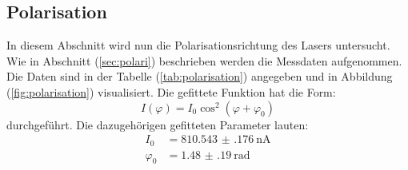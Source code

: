 \subsection{Polarisation}
\label{sec:pol}

In diesem Abschnitt wird nun die Polarisationsrichtung des Lasers untersucht. Wie in Abschnitt (\ref{sec:polari}) beschrieben werden die Messdaten aufgenommen.
Die Daten sind in der Tabelle (\ref{tab:polarisation}) angegeben und in Abbildung (\ref{fig:polarisation}) visualisiert.
Die gefittete Funktion hat die Form:
\begin{equation}
  I(\varphi) = I_0 \cos^2\left(\varphi+\varphi_0\right)
\end{equation}
durchgeführt.
Die dazugehörigen gefitteten Parameter lauten:
\begin{align*}
I_0 &= \SI{810.543(176)}{\nano\ampere}\\
\varphi_0 &= \SI{1.48(19)}{\radian}\\
\end{align*}

